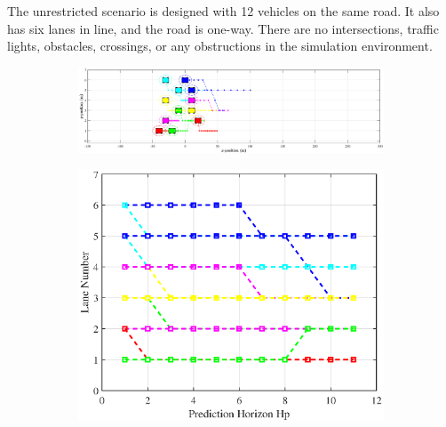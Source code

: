 The unrestricted scenario is designed with 12 vehicles on the same road. It also has six lanes in line, and the road is one-way. There are no intersections, traffic lights, obstacles, crossings, or any obstructions in the simulation environment.


\begin{figure}[h!]
\centering
\begin{subfigure}[t]{\textwidth}
    \includegraphics[width=\textwidth]{Kap6/no_restricted/no_restricted_traj0.eps}
    \label{fig:first}
\end{subfigure}
\vspace{1cm}
\begin{subfigure}[b]{0.45\textwidth}
    \includegraphics[width=\textwidth]{Kap6/no_restricted/no_restricted_lane0.eps}
    \label{fig:second}
\end{subfigure}
\hfill
\begin{subfigure}[b]{0.45\textwidth}

\end{subfigure}
\end{figure}
